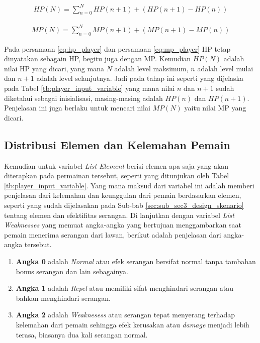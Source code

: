 \begin{equation}\label{eq:hp_player}
	\begin{split}
		HP(N) = \sum_{n = 0}^{N} HP(n + 1) + \left(HP(n + 1) - HP(n) \right)
	\end{split}
\end{equation}

\begin{equation}\label{eq:mp_player}
	\begin{split}
		MP(N) = \sum_{n = 0}^{N} MP(n + 1) + \left(MP(n + 1) - MP(n) \right)
	\end{split}
\end{equation}

Pada persamaan \ref{eq:hp_player} dan persamaan \ref{eq:mp_player} HP tetap dinyatakan sebagain HP, begitu juga dengan MP. Kemudian $HP(N)$ adalah nilai HP yang dicari, yang mana $N$ adalah level maksimum, $n$ adalah level mulai dan $n + 1$ adalah level selanjutnya. Jadi pada tahap ini seperti yang dijelaska pada Tabel \ref{tb:player_input_variable} yang mana nilai $n$ dan $n + 1$ sudah diketahui sebagai inisialisasi, masing-masing adalah $HP(n)$ dan $HP(n + 1)$. Penjelasan ini juga berlaku untuk mencari nilai $MP(N)$ yaitu nilai MP yang dicari.
\vspace{1ex}

\subsection{Distribusi Elemen dan Kelemahan Pemain}
\label{sec:sub_sec3_list_element_player}
\vspace{1ex}

Kemudian untuk variabel \textit{List Element} berisi elemen apa saja yang akan diterapkan pada permainan tersebut, seperti yang ditunjukan oleh Tabel \ref{tb:player_input_variable}. Yang mana maksud dari variabel ini adalah memberi penjelasan dari kelemahan dan keunggulan dari pemain berdasarkan elemen, seperti yang sudah dijelasakan pada Sub-bab \ref{sec:sub_sec3_design_skenario} tentang elemen dan efektifitas serangan. Di lanjutkan dengan variabel \textit{List Weaknesses} yang memuat angka-angka yang bertujuan menggambarkan saat pemain menerima serangan dari lawan, berikut adalah penjelasan dari angka-angka tersebut.

\begin{enumerate}[label=\alph*).]
	\item \textbf{Angka 0} adalah \textit{Normal} atau efek serangan bersifat normal tanpa tambahan bonus serangan dan lain sebagainya.
	\item \textbf{Angka 1} adalah \textit{Repel} atau memiliki sifat menghindari serangan atau bahkan menghindari serangan.
	\item \textbf{Angka 2} adalah \textit{Weaknesess} atau serangan tepat menyerang terhadap kelemahan dari pemain sehingga efek kerusakan atau \textit{damage} menjadi lebih terasa, biasanya dua kali serangan normal. 
\end{enumerate}

